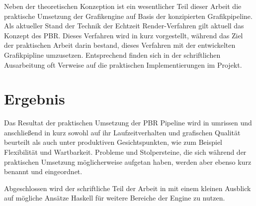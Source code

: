 Neben der theoretischen Konzeption ist ein wesentlicher Teil dieser Arbeit die praktische Umsetzung der Grafikengine auf Basis der konzipierten Grafikpipeline. Als aktueller Stand der Technik der Echtzeit Render-Verfahren gilt aktuell das Konzept des \ac{PBR}. Dieses Verfahren wird in  kurz vorgestellt, während das Ziel der praktischen Arbeit darin bestand, dieses Verfahren mit der entwickelten Grafikpipline umzusetzen. Entsprechend finden sich in der schriftlichen Ausarbeitung oft Verweise auf die praktischen Implementierungen im Projekt.

\section{Ergebnis}
Das Resultat der praktischen Umsetzung der \ac{PBR} Pipeline wird in  umrissen und anschließend in  kurz sowohl auf ihr Laufzeitverhalten und grafischen Qualität beurteilt als auch unter produktiven Gesichtspunkten, wie zum Beispiel Flexibilität und Wartbarkeit. Probleme und Stolpersteine, die sich während der praktischen Umsetzung möglicherweise aufgetan haben, werden aber ebenso kurz benannt und eingeordnet.

Abgeschlossen wird der schriftliche Teil der Arbeit in  mit einem kleinen Ausblick auf mögliche Ansätze Haskell für weitere Bereiche der Engine zu nutzen.

